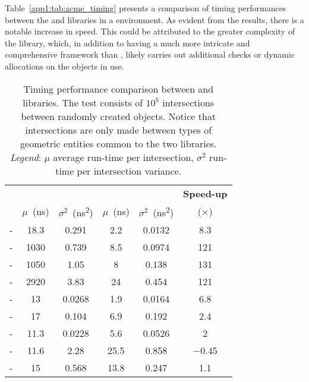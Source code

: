 Table~\ref{app1:tab:acme_timing} presents a comparison of timing performances between the \CGAL{} and \Acme{} libraries in a \cpp{} environment. As evident from the results, there is a notable increase in speed. This could be attributed to the greater complexity of the \CGAL{} library, which, in addition to having a much more intricate and comprehensive framework than \Acme{}, likely carries out additional checks or dynamic allocations on the objects in use.

\begin{table}[!htb]
  \centering
  \begin{tabular}{cccccc}
    \toprule
     &
     &  &
    \textbf{Speed-up} \\ \cmidrule(l{4pt}r{4pt}){2-3} \cmidrule(l{4pt}r{4pt}){4-5}
    & $\mu$~(\si{\nano\second}) & $\sigma^2$~(\si{\nano\second\squared}) &
      $\mu$~(\si{\nano\second}) & $\sigma^2$~(\si{\nano\second\squared}) &
      ($\times$) \\
    \midrule
    \Line{}-\Line{}         & \num{18.3} & \num{0.291}  & \num{2.2}  & \num{0.0132} & \num{8.3} \\
    \Ray{}-\Ray{}           & \num{1030} & \num{0.739}  & \num{8.5}  & \num{0.0974} & \num{121} \\
    \Segment{}-\Segment{}   & \num{1050} & \num{1.05}   & \num{8}    & \num{0.138}  & \num{131} \\
    \Triangle{}-\Triangle{} & \num{2920} & \num{3.83}   & \num{24}   & \num{0.454}  & \num{121} \\
    \Line{}-\Ray{}          & \num{13}   & \num{0.0268} & \num{1.9}  & \num{0.0164} & \num{6.8} \\
    \Line{}-\Segment{}      & \num{17}   & \num{0.104}  & \num{6.9}  & \num{0.192}  & \num{2.4} \\
    \Line{}-\Triangle{}     & \num{11.3} & \num{0.0228} & \num{5.6}  & \num{0.0526} & \num{2} \\
    \Ray{}-\Triangle{}      & \num{11.6} & \num{2.28}   & \num{25.5} & \num{0.858}  & \num{-0.45} \\
    \Segment{}-\Triangle{}  & \num{15}   & \num{0.568}  & \num{13.8} & \num{0.247}  & \num{1.1} \\
    \bottomrule
  \end{tabular}
  \caption[Timing performance comparison between \CGAL{} and \Acme{} libraries.]{Timing performance comparison between \CGAL{} and \Acme{} libraries. The test consists of $10^5$ intersections between randomly created objects. Notice that intersections are only made between types of geometric entities common to the two libraries. \emph{Legend}: $\mu$ average run-time per intersection, $\sigma^2$ run-time per intersection variance.}
  \label{app1:acme_timing}
\end{table}

